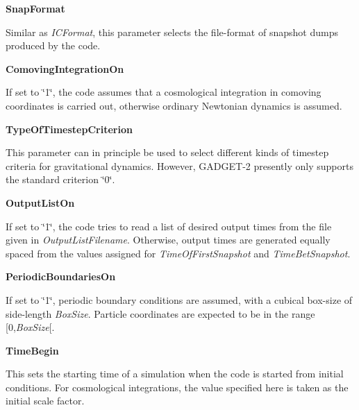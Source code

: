 \begin{DoxyItemize}
\item {\bfseries SnapFormat} \par
 Similar as {\itshape ICFormat\/}, this parameter selects the file-\/format of snapshot dumps produced by the code.
\end{DoxyItemize}


\begin{DoxyItemize}
\item {\bfseries ComovingIntegrationOn} \par
 If set to \char`\"{}1\char`\"{}, the code assumes that a cosmological integration in comoving coordinates is carried out, otherwise ordinary Newtonian dynamics is assumed.
\end{DoxyItemize}


\begin{DoxyItemize}
\item {\bfseries TypeOfTimestepCriterion} \par
 This parameter can in principle be used to select different kinds of timestep criteria for gravitational dynamics. However, GADGET-\/2 presently only supports the standard criterion \char`\"{}0\char`\"{}.
\end{DoxyItemize}


\begin{DoxyItemize}
\item {\bfseries OutputListOn} \par
 If set to \char`\"{}1\char`\"{}, the code tries to read a list of desired output times from the file given in {\itshape OutputListFilename\/}. Otherwise, output times are generated equally spaced from the values assigned for {\itshape TimeOfFirstSnapshot\/} and {\itshape TimeBetSnapshot\/}.
\end{DoxyItemize}


\begin{DoxyItemize}
\item {\bfseries PeriodicBoundariesOn} \par
 If set to \char`\"{}1\char`\"{}, periodic boundary conditions are assumed, with a cubical box-\/size of side-\/length {\itshape BoxSize\/}. Particle coordinates are expected to be in the range \mbox{[}0,{\itshape BoxSize\/}\mbox{[}.
\end{DoxyItemize}


\begin{DoxyItemize}
\item {\bfseries TimeBegin} \par
 This sets the starting time of a simulation when the code is started from initial conditions. For cosmological integrations, the value specified here is taken as the initial scale factor.
\end{DoxyItemize}



